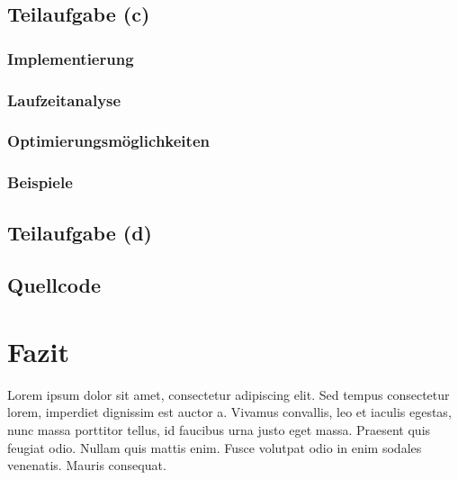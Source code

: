 \documentclass[a4paper,12pt]{article}			%
\begin{document}
\subsection{Teilaufgabe (c)}
\subsubsection{Implementierung}
\subsubsection{Laufzeitanalyse}
\subsubsection{Optimierungsmöglichkeiten}
\subsubsection{Beispiele}

\subsection{Teilaufgabe (d)}

\subsection{Quellcode}


\newpage
\section{Fazit}



Lorem ipsum dolor sit amet, consectetur adipiscing elit. Sed tempus consectetur lorem, imperdiet dignissim est auctor a. Vivamus convallis, leo et iaculis egestas, nunc massa porttitor tellus, id faucibus urna justo eget massa. Praesent quis feugiat odio. Nullam quis mattis enim. Fusce volutpat odio in enim sodales venenatis. Mauris consequat.

\end{document}
